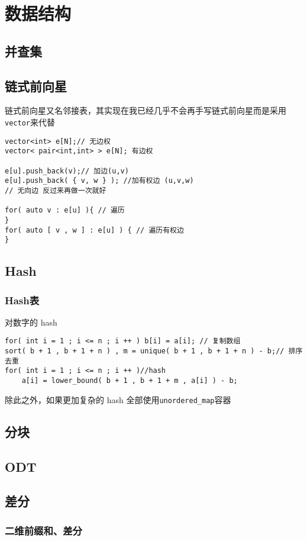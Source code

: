 \chapter{数据结构}

\section{并查集}



\section{链式前向星}
链式前向星又名邻接表，其实现在我已经几乎不会再手写链式前向星而是采用\verb|vector|来代替
\begin{lstlisting}
vector<int> e[N];// 无边权
vector< pair<int,int> > e[N]; 有边权

e[u].push_back(v);// 加边(u,v)
e[u].push_back( { v, w } ); //加有权边 (u,v,w)
// 无向边 反过来再做一次就好

for( auto v : e[u] ){ // 遍历
}
for( auto [ v , w ] : e[u] ) { // 遍历有权边
}

\end{lstlisting}

\section{Hash}
\subsection{Hash表}
对数字的 hash
\begin{lstlisting}
for( int i = 1 ; i <= n ; i ++ ) b[i] = a[i]; // 复制数组
sort( b + 1 , b + 1 + n ) , m = unique( b + 1 , b + 1 + n ) - b;// 排序去重
for( int i = 1 ; i <= n ; i ++ )//hash
    a[i] = lower_bound( b + 1 , b + 1 + m , a[i] ) - b;
\end{lstlisting}
除此之外，如果更加复杂的 hash 全部使用\verb|unordered_map|容器







\section{分块}


\section{ODT}




\section{差分}



\subsection{二维前缀和、差分}



